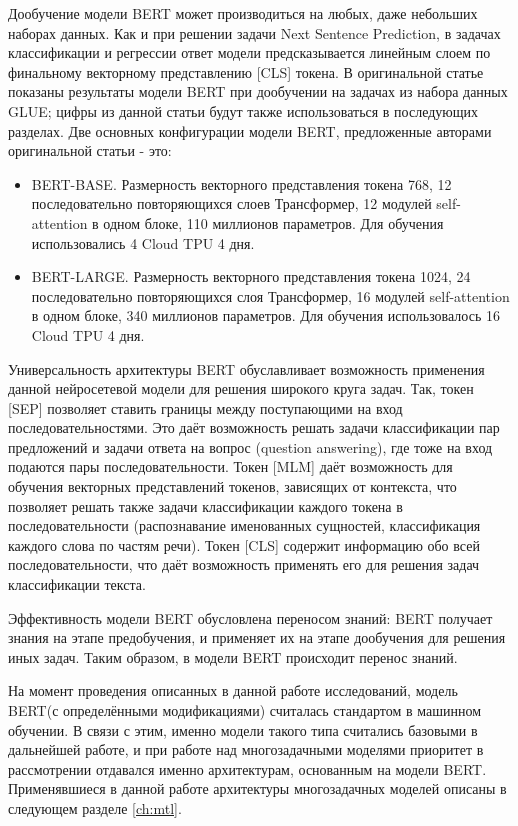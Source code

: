 Дообучение модели BERT может производиться на любых, даже небольших наборах данных. Как и при решении задачи Next Sentence Prediction, в задачах классификации и регрессии ответ модели предсказывается линейным слоем по финальному векторному представлению [CLS] токена. В оригинальной статье показаны результаты модели BERT при дообучении на задачах из набора данных GLUE; цифры из данной статьи будут также использоваться в последующих разделах. 
Две основных конфигурации модели BERT, предложенные авторами оригинальной статьи - это:
\begin{itemize}
\item BERT-BASE. Размерность векторного представления токена 768, 12 последовательно повторяющихся слоев Трансформер, 12 модулей self-attention в одном блоке, 110 миллионов параметров. Для обучения использовались 4 Cloud TPU 4 дня. 
\item BERT-LARGE. Размерность векторного представления токена 1024, 24 последовательно повторяющихся слоя Трансформер, 16 модулей self-attention в одном блоке, 340 миллионов параметров. Для обучения использовалось 16 Cloud TPU 4 дня. 
\end{itemize}

Универсальность архитектуры BERT обуславливает возможность применения данной нейросетевой модели для решения широкого круга задач. Так, токен [SEP] позволяет ставить границы между поступающими на вход последовательностями. Это даёт возможность решать задачи классификации пар предложений и задачи ответа на вопрос (question answering), где тоже на вход подаются пары последовательности. Токен [MLM] даёт возможность для обучения векторных представлений токенов, зависящих от контекста, что позволяет решать также задачи классификации каждого токена в последовательности (распознавание именованных сущностей, классификация каждого слова по частям речи). Токен [CLS] содержит информацию обо всей последовательности, что даёт возможность применять его для решения задач классификации текста. 

Эффективность модели BERT обусловлена переносом знаний: BERT получает знания на этапе предобучения, и применяет их на этапе дообучения для решения иных задач. Таким образом, в модели BERT происходит перенос знаний. 

На момент проведения описанных в данной работе исследований, модель BERT(с определёнными модификациями) считалась стандартом в машинном обучении. В связи с этим, именно модели такого типа считались базовыми в дальнейшей работе, и при работе над многозадачными моделями приоритет в рассмотрении отдавался именно архитектурам, основанным на модели BERT. Применявшиеся в данной работе архитектуры многозадачных моделей описаны в следующем разделе \ref{ch:mtl}.

